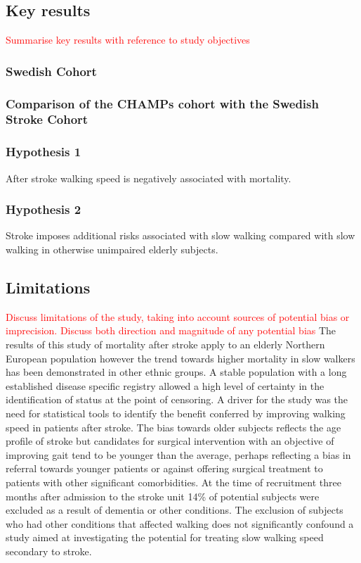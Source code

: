 \documentclass[a4paper,12pt]{article}
\begin{document}
\subsection{Key results}  \textcolor{red}{Summarise key results with reference to study objectives}
\subsubsection{Swedish Cohort}
\subsubsection{Comparison of the CHAMPs cohort with the Swedish Stroke Cohort}
\subsubsection{Hypothesis 1}After stroke walking speed is negatively associated with mortality.
\subsubsection{Hypothesis 2}Stroke imposes additional risks associated with slow walking compared with slow walking in otherwise unimpaired elderly subjects.

\subsection{Limitations}  \textcolor{red}{Discuss limitations of the study, taking into account sources of potential bias or imprecision. Discuss both direction and magnitude of any potential bias} The results of this study of mortality after stroke apply to an elderly Northern European population however the trend towards higher mortality in slow walkers has been demonstrated in other ethnic groups\cite{Chiaranda2013,Ostir2007}. A stable population with a long established disease specific registry allowed a high level of certainty in the identification of status at the point of censoring. A driver for the study was the need for statistical tools to identify the benefit conferred by improving walking speed in patients after stroke. The bias towards older subjects reflects the age profile of stroke but candidates for surgical intervention with an objective of improving gait tend to be younger than the average, perhaps reflecting a bias in referral towards younger patients or against offering surgical treatment to patients with other significant comorbidities. At the time of recruitment three months after admission to the stroke unit 14\% of potential subjects were excluded as a result of dementia or other conditions. The exclusion of subjects who had other conditions that affected walking does not significantly confound a study aimed at investigating the potential for treating slow walking speed secondary to stroke. 
\end{document}
